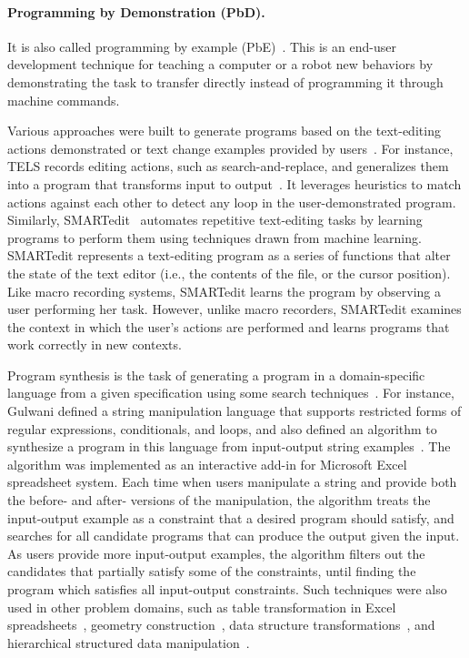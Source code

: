 \paragraph{Programming by Demonstration (PbD).}
It is also called programming by example (PbE)~\cite{Lie2001}. 
This is an end-user development technique for teaching a computer or a robot new behaviors by demonstrating the task to transfer directly instead of programming it through machine commands. 

Various approaches were built to generate programs based on the text-editing actions demonstrated or text change examples provided by users~\cite{Nix1984,WiM1993,LaH1995,LWD2001}. For instance, 
TELS records editing actions, such as search-and-replace, and generalizes them into a program that transforms input to output~\cite{WiM1993}. It leverages heuristics to match actions against each other to detect any loop in the user-demonstrated program. 
Similarly, SMARTedit~\cite{LWD2001} automates repetitive text-editing tasks by learning programs to perform them using techniques drawn from machine learning. SMARTedit represents a text-editing program as a series of functions that alter the state of the text editor (i.e., the contents of the file, or the cursor position). Like macro recording systems, SMARTedit learns the program by observing a user performing her task. However, unlike macro recorders, SMARTedit examines the context in which the user's actions are performed and learns programs that work correctly in new contexts. 

Program synthesis is the task of generating a program in a domain-specific language from a given specification using some search techniques~\cite{Gul2010}. For instance, Gulwani defined a string manipulation language that supports restricted forms of regular expressions, conditionals, and loops, and also defined an algorithm to synthesize a program in this language from input-output string examples~\cite{Gul2011}. The algorithm was implemented as an interactive add-in for Microsoft Excel spreadsheet system. Each time when users manipulate a string and provide both the before- and after- versions of the manipulation, the algorithm treats the input-output example as a constraint that a desired program should satisfy, and searches for all candidate programs that can produce the output given the input. As users provide more input-output examples, the algorithm filters out the candidates that partially satisfy some of the constraints, until finding the program which satisfies all input-output constraints. Such techniques were also used in other problem domains, such as table transformation in Excel spreadsheets~\cite{HaG2011}, geometry construction~\cite{GKT2011}, data structure transformations~\cite{Feser:2015}, and hierarchical structured data manipulation~\cite{Yaghmazadeh:2016}.

